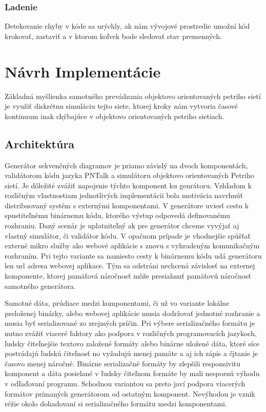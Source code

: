 	\subsection{Ladenie}
	Detekovanie chyby v kóde sa urýchly, ak nám vývojové prostredie umožní kód krokovať, zastaviť a v ktorom koľvek bode sledovať stav premenných.



\chapter{Návrh Implementácie}

Základná myšlienka samotného prevádzania objektovo orientovaných petriho sietí je využiť diskrétnu simuláciu tejto siete, ktorej kroky nám vytvoria časové kontinuum inak chýbajúce v objektovo orientovaných petriho sietiach. 

\section{Architektúra}

Generátor sekvenčných diagramov\cite{Analysis2012} je priamo závislý na dvoch komponentách, validátorom kódu jazyka PNTalk a simulátoru objektovo orientovaných Petriho sietí. Je dôležité zvážiť napojenie týchto komponent ku genrátoru. Vzhľadom k rozličným vlastnostiam jednotlivých implementácii bola motivácia navrhnúť distribuovaný systém s externými komponentami. V generátore uviesť cestu k spustiteľnému binárnemu kódu, ktorého výstup odpovedá definovanému rozhraniu. Daný scenár je uplatniteľný ak pre generátor chceme vyvýjať aj vlastný simulátor, či validátor kódu. V opačnom prípade je vhodnejšie spúšťať externé mikro služby ako webové aplikácie s znovu s vyhradeným komunikačným rozhraním. Pri tejto variante sa namiesto cesty k binárnemu kódu udá generátoru len url adresa webovej aplikace. Tým sa odstráni nechcená závislosť na externej komponente, ktorej pamäťová náročnosť môže presiahnuť pamäťovú náročnosť samotného generátora.

Samotné dáta, prúdiace medzi komponentami, či už vo variante lokálne preloženej binárky, alebo webovej aplikácie musia dodržovať jednotné rozhranie a musia byť serializované zo zrejmých príčin. Pri výbere serializačného formátu je nutno zvážiť viaceré faktory ako podpora v rozličných programovacích jazykoch, ľudsky čiteľnejšie textovo založené formáty alebo binárne uložené dáta, ktoré síce postrádajú ľudskú čiteľnosť no vyžadujú menej pamäte a aj ich zápis a čįtanie je časovo menej náročné. Binárne serializačné formáty by zlepšili responsivitu komponent a dáta posielané v ľudsky čiteľnom formáte by mali nespornú výhodu v odľaďovaní programu. Schodnou variantou sa preto javí podpora viacerých formátov prímaných generátorom od ostatným komponent. Nevýhodou je vznik réžie okolo dohadovaní si serializačného formátu medzi komponentami.


